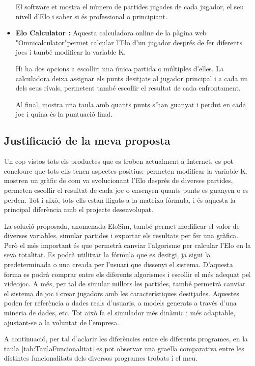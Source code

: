 \documentclass[a4paper]{article}
\begin{document}
\begin{itemize}
    El software et mostra el número de partides jugades de cada jugador, el seu nivell d'Elo i saber si és professional o principiant. 
    
    \item \textbf{Elo Calculator \cite{EloSystemOmnicalculator}:} Aquesta calculadora online de la pàgina web "Omnicalculator"\space permet calcular l'Elo d'un jugador després de fer diferents jocs i també modificar la variable K. 
    
    Hi ha dos opcions a escollir: una única partida o múltiples d'elles. La calculadora deixa assignar els punts desitjats al jugador principal i a cada un dels seus rivals, permetent també escollir el resultat de cada enfrontament.
    
    Al final, mostra una taula amb quants punts s'han guanyat i perdut en cada joc i quina és la puntuació final.
\end{itemize}

\subsection{Justificació de la meva proposta}
Un cop vistos tots els productes que es troben actualment a Internet, es pot concloure que tots ells tenen aspectes positius: permeten modificar la variable K,  mostren un gràfic de com va evolucionant l'Elo després de diverses partides,  permeten escollir el resultat de cada joc o ensenyen quants punts es guanyen o es perden. Tot i això, tots ells estan lligats a la mateixa fórmula, i és aquesta la principal diferència amb el projecte desenvolupat.

La solució proposada, anomenada EloSim, també permet modificar el valor de diverses variables, simular partides i exportar els resultats per fer una gràfica. Però el més important és que permetrà canviar l'algorisme per calcular l'Elo en la seva totalitat. Es podrà utilitzar la fórmula que es desitgi, ja sigui la predeterminada o una creada per l'usuari que dissenyi el sistema. D'aquesta forma es podrà comprar entre els diferents algorismes i escollir el més adequat pel videojoc. A més, per tal de simular millors les partides, també permetrà canviar el sistema de joc i crear jugadors amb les característiques desitjades. Aquestes poden fer referència a dades reals d'usuaris, a models generats a través d'una mineria de dades, etc. Tot això fa el simulador més dinàmic i més adaptable, ajustant-se a la voluntat de l'empresa.

A continuació, per tal d'aclarir les diferències entre els diferents programes, en la taula \ref{tab:TaulaFuncionalitat} es pot observar una graella comparativa entre les distintes funcionalitats dels diversos programes trobats i el meu.
\end{document}
